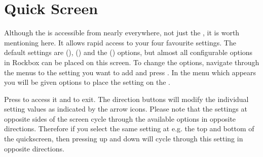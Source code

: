 {
\section{\label{ref:QuickScreen}Quick Screen}
  Although the  is accessible from nearly everywhere,
  not just the , it is worth mentioning here.  It allows
  rapid access to your four favourite settings.  The default settings are
   (),
   () and the
   () options, but almost all
  configurable options in Rockbox can be placed on this screen.  To change the
  options, navigate through the menus to the setting you want to add and press
  \ActionStdContext.  In the menu which appears you will be given options
  to place the setting on the .
  
  Press \ActionStdQuickScreen{} to access it and \ActionQuickScreenExit{} to exit.
  The direction buttons will modify the individual setting values as indicated 
  by the arrow icons. Please note that the settings at opposite sides of the
   screen cycle through the available options in opposite directions.
   Therefore if you select the same setting at e.g. the top and bottom of the
   quickscreen, then pressing up and down will cycle through this setting in
   opposite directions.
}
